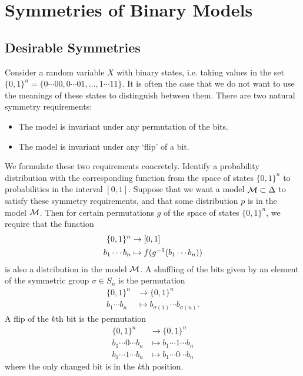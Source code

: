 \documentclass[cclicense]{hmcthesis}
\numberwithin{equation}{chapter}
\numberwithin{thmcounter}{chapter}
\begin{document}
\chapter{Symmetries of Binary Models}

\section{Desirable Symmetries}

    Consider a random variable $X$ with binary states, i.e. taking values in the
    set $\{0, 1\}^n = \{0\cdots00, 0\cdots01, \ldots, 1\cdots11\}$.  It is often
    the case that we do not want to use the meanings of these states to
    distinguish between them.  There are two natural symmetry requirements:
    \begin{itemize}\nospace
    \item The model is invariant under any permutation of the bits.
    \item The model is invariant under any `flip' of a bit.
    \end{itemize}

    We formulate these two requirements concretely.  Identify a probability
    distribution with the corresponding function from the space of states $\{0,
    1\}^n$ to probabilities in the interval $[0, 1]$.  Suppose that we want a
    model $\mathcal{M} \subset \Delta$ to satisfy these symmetry requirements, and that
    some distribution $p$ is in the model $\mathcal{M}$.  Then for certain permutations
    $g$ of the space of states $\{0, 1\}^n$, we require that
    the function
    \begin{align*}
        \{0, 1\}^n &\to [0, 1] \\
        b_1 \cdots b_n &\mapsto f(g^{-1}(b_1 \cdots b_n))
    \end{align*}
    is also a distribution in the model $\mathcal{M}$.  A shuffling of the bits given
    by an element of the symmetric group $\sigma \in S_n$ is the permutation
    \begin{align*}
        \{0, 1\}^n &\to \{0, 1\}^n \\
        b_1 \cdots b_n &\mapsto b_{\sigma(1)} \cdots b_{\sigma(n)}.
    \end{align*}
    A flip of the $k$th bit is the permutation
    \begin{align*}
        \{0, 1\}^n &\to \{0, 1\}^n \\
        b_1 \cdots 0 \cdots b_n 
        &\mapsto
        b_1 \cdots 1 \cdots b_n  \\
        b_1 \cdots 1 \cdots b_n 
        &\mapsto
        b_1 \cdots 0 \cdots b_n
    \end{align*}
    where the only changed bit is in the $k$th position.
\end{document}
